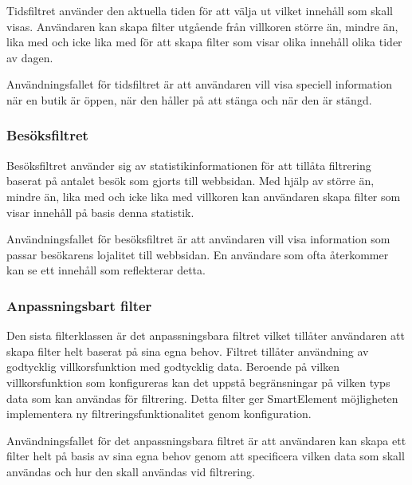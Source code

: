Tidsfiltret använder den aktuella tiden för att välja ut vilket innehåll som skall visas. Användaren kan skapa filter utgående från villkoren större än, mindre än, lika med och icke lika med för att skapa filter som visar olika innehåll olika tider av dagen.

Användningsfallet för tidsfiltret är att användaren vill visa speciell information när en butik är öppen, när den håller på att stänga och när den är stängd.

\subsubsection{Besöksfiltret}

Besöksfiltret använder sig av statistikinformationen för att tillåta filtrering baserat på antalet besök som gjorts till webbsidan. Med hjälp av större än, mindre än, lika med och icke lika med villkoren kan användaren skapa filter som visar innehåll på basis denna statistik.

Användningsfallet för besöksfiltret är att användaren vill visa information som passar besökarens lojalitet till webbsidan. En användare som ofta återkommer kan se ett innehåll som reflekterar detta.

\subsubsection{Anpassningsbart filter}

Den sista filterklassen är det anpassningsbara filtret vilket tillåter användaren att skapa filter helt baserat på sina egna behov. Filtret tillåter användning av godtycklig villkorsfunktion med godtycklig data. Beroende på vilken villkorsfunktion som konfigureras kan det uppstå begränsningar på vilken typs data som kan användas för filtrering. Detta filter ger SmartElement möjligheten implementera ny filtreringsfunktionalitet genom konfiguration.

Användningsfallet för det anpassningsbara filtret är att användaren kan skapa ett filter helt på basis av sina egna behov genom att specificera vilken data som skall användas och hur den skall användas vid filtrering.


